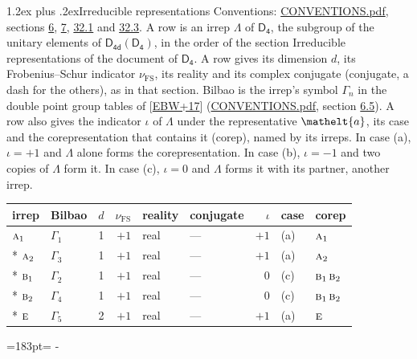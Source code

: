 \documentclass[10pt,a4paper]{article}
\makeatletter
\renewcommand\section{\@startsection{section}{1}{\z@}{-3ex plus -1ex minus -.2ex}%
  {1.2ex plus .2ex}{\normalfont\large\sffamily\bfseries\color{parttitle}}}
\newcommand{\needspace}[1]{\par\penalty-100\begingroup\dimen0=#1\relax\dimen2=\pagegoal
  \advance\dimen2-\pagetotal\ifdim\dimen0>\dimen2\relax\ifdim\dimen2>0pt\vfil\break\fi\fi
  \endgroup}
\numberwithin{equation}{section}
\newcommand{\eltfont}[1]{{\let\sigma\eltsigma\mathelt{#1}}}
\newcommand{\grp}[1]{\mathsf{#1}}
\newcommand{\irr}[1]{\text{\normalfont\scshape #1}}
\newcommand{\elt}[1]{\eltfont{#1}}
\newcommand{\fsind}{\nu_{\mathrm{FS}}}
\makeatother
\begin{document}
\section{Irreducible representations}\label{s:irreps}
Conventions: \href{../../CONVENTIONS.pdf}{CONVENTIONS.pdf}, sections \href{../../../rotation/CONVENTIONS.pdf\#conv.6}{6}, \href{../../../rotation/CONVENTIONS.pdf\#conv.7}{7}, \href{../../CONVENTIONS.pdf\#conv.32.1}{32.1} and \href{../../CONVENTIONS.pdf\#conv.32.3}{32.3}.
\leavevmode\label{n:irrep.Delta}A row is an irrep $\Lambda$ of $\grp{D_{4}}$, the subgroup of the unitary elements of $\grp{D_{4d}}(\grp{D_{4}})$, in the order of the section Irreducible representations of the document of \href{../../../rotation/data/pdf/D4.pdf}{$\grp{D_{4}}$}. \label{n:index.dimension}\label{n:index.frobenius}\label{n:head.irrep}\label{n:head.reality}\label{n:head.conjugate}A row gives its dimension $d$, its Frobenius--Schur indicator $\fsind$, its reality and its complex conjugate (conjugate, a dash for the others), as in that section. \label{n:head.bilbao}\label{n:irrep.alias.gamma}Bilbao is the irrep's symbol $\Gamma_n$ in the double point group tables of [\href{../../../REFERENCES.pdf\#ref.EBW+17}{EBW+17}] (\href{../../CONVENTIONS.pdf}{CONVENTIONS.pdf}, section \href{../../../rotation/CONVENTIONS.pdf\#conv.6.5}{6.5}). \label{n:head.case.corep}\label{n:head.corep}A row also gives the indicator $\iota$ of $\Lambda$ under the representative $\elt{a}$, its case and the corepresentation that contains it (corep), named by its irreps. In case (a), $\iota = +1$ and $\Lambda$ alone forms the corepresentation. In case (b), $\iota = -1$ and two copies of $\Lambda$ form it. In case (c), $\iota = 0$ and $\Lambda$ forms it with its partner, another irrep.
\setlength{\emergencystretch}{2em}\par\setlength{\emergencystretch}{0pt}
{\small\renewcommand{\arraystretch}{1.25}\setlength{\tabcolsep}{4pt}\begin{longtable}{@{}llrrllrll@{}}\toprule
irrep & Bilbao & $d$ & $\fsind$ & reality & conjugate & $\iota$ & case & corep\\\midrule\endhead
\bottomrule\endfoot\endlastfoot
$\irr{a}_{1}$ & $\Gamma_{1}$ & 1 & $+1$ & real & --- & $+1$ & (a) & $\irr{a}_{1}$\\*
$\irr{a}_{2}$ & $\Gamma_{3}$ & 1 & $+1$ & real & --- & $+1$ & (a) & $\irr{a}_{2}$\\*
$\irr{b}_{1}$ & $\Gamma_{2}$ & 1 & $+1$ & real & --- & $0$ & (c) & $\irr{b}_{1}\,\irr{b}_{2}$\\*
$\irr{b}_{2}$ & $\Gamma_{4}$ & 1 & $+1$ & real & --- & $0$ & (c) & $\irr{b}_{1}\,\irr{b}_{2}$\\*
$\irr{e}$ & $\Gamma_{5}$ & 2 & $+1$ & real & --- & $+1$ & (a) & $\irr{e}$\\
\bottomrule\end{longtable}}
\needspace{183pt}
\end{document}
